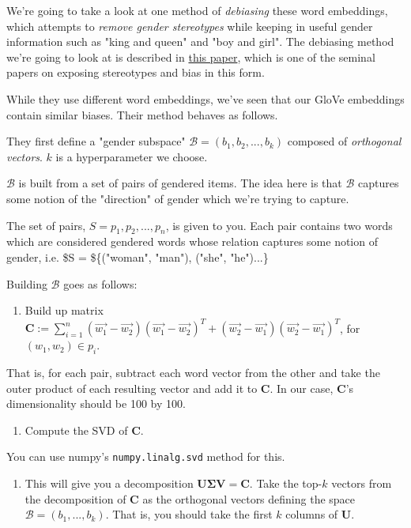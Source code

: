 \documentclass[11pt]{article}
\providecommand{\tightlist}{%
      \setlength{\itemsep}{0pt}\setlength{\parskip}{0pt}}
\begin{document}
We're going to take a look at one method of \emph{debiasing} these word
embeddings, which attempts to \emph{remove gender stereotypes} while
keeping in useful gender information such as "king and queen" and "boy
and girl". The debiasing method we're going to look at is described in
\href{https://arxiv.org/abs/1607.06520}{this paper}, which is one of the
seminal papers on exposing stereotypes and bias in this form.

While they use different word embeddings, we've seen that our GloVe
embeddings contain similar biases. Their method behaves as follows.

They first define a "gender subspace"
\(\mathcal{B} = (b_1, b_2, ..., b_k)\) composed of \emph{orthogonal
vectors}. \(k\) is a hyperparameter we choose.

\(\mathcal{B}\) is built from a set of pairs of gendered items. The idea
here is that \(\mathcal{B}\) captures some notion of the "direction" of
gender which we're trying to capture.

The set of pairs, \(S = p_1, p_2, ..., p_n\), is given to you. Each pair
contains two words which are considered gendered words whose relation
captures some notion of gender, i.e. \$S = \$\{("woman", "man"), ("she",
"he")...\}

Building \(\mathcal{B}\) goes as follows:

\begin{enumerate}
\def\labelenumi{\arabic{enumi}.}
\tightlist
\item
  Build up matrix
  \(\mathbf{C} := \sum_{i=1}^n (\vec{w_1} - \vec{w_2})(\vec{w_1} - \vec{w_2})^T + (\vec{w_2} - \vec{w_1})(\vec{w_2} - \vec{w_1})^T\),
  for \((w_1, w_2) \in p_i\).
\end{enumerate}

That is, for each pair, subtract each word vector from the other and
take the outer product of each resulting vector and add it to
\(\mathbf{C}\). In our case, \(\mathbf{C}\)'s dimensionality should be
100 by 100.

\begin{enumerate}
\def\labelenumi{\arabic{enumi}.}
\setcounter{enumi}{1}
\tightlist
\item
  Compute the SVD of \(\mathbf{C}\).
\end{enumerate}

You can use numpy's \texttt{numpy.linalg.svd} method for this.

\begin{enumerate}
\def\labelenumi{\arabic{enumi}.}
\setcounter{enumi}{2}
\tightlist
\item
  This will give you a decomposition
  \(\mathbf{U}\mathbf{\Sigma}\mathbf{V} = \mathbf{C}\). Take the
  top-\(k\) vectors from the decomposition of \(\mathbf{C}\) as the
  orthogonal vectors defining the space
  \(\mathcal{B} = (b_1, ..., b_k)\). That is, you should take the first
  \(k\) columns of \(\mathbf{U}\).
\end{enumerate}
\end{document}
